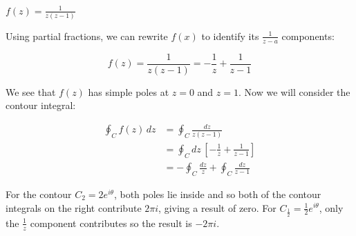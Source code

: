\documentclass{physics_notes}
\begin{document}
\begin{example}{$f(z) = \frac{1}{z(z-1)}$}

Using partial fractions, we can rewrite $f(x)$ to identify its $\frac{1}{z-a}$ components:

\[ f(z) = \frac{1}{z(z-1)} = -\frac{1}{z} + \frac{1}{z-1} \]

We see that $f(z)$ has simple poles at $z = 0$ and $z = 1$. Now we will consider the contour integral:

\begin{align*}
	\oint_C f(z)\, dz &= \oint_C \frac{dz}{z(z-1)} \\
	&= \oint_C dz\,\left[-\frac{1}{z}+\frac{1}{z-1}\right] \\
	&= -\oint_C \frac{dz}{z} + \oint_C \frac{dz}{z-1}
\end{align*}

For the contour $C_2 = 2e^{i\theta}$, both poles lie inside and so both of the contour integrals on the right contribute $2\pi i$, giving a result of zero. For $C_\frac{1}{2} = \frac{1}{2}e^{i\theta}$, only the $\frac{1}{z}$ component contributes so the result is $-2\pi i$.

\end{example}
\end{document}
